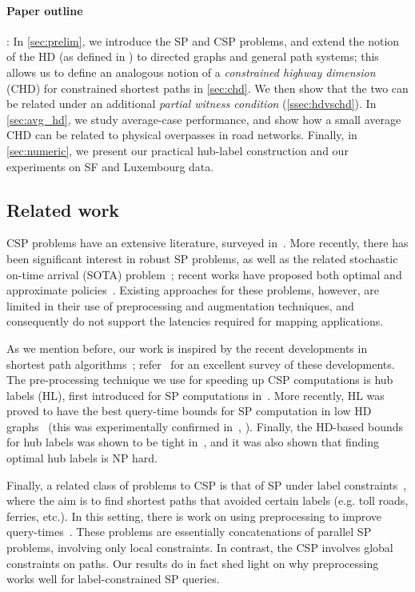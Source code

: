\paragraph{Paper outline}:
In \cref{sec:prelim}, we introduce the SP and CSP problems, and extend the notion of the HD (as defined in \cite{highway2013}) to directed graphs and general path systems; this allows us to define an analogous notion of a \emph{constrained highway dimension} (CHD) for constrained shortest paths in \cref{sec:chd}. 
We then show that the two can be related under an additional \emph{partial witness condition} (\cref{ssec:hdvschd}). 
In \cref{sec:avg_hd}, we study average-case performance, and show how a small average CHD can be related to physical overpasses in road networks. 
Finally, in \cref{sec:numeric}, we present our practical hub-label construction and our experiments on SF and Luxembourg data.


\subsection{Related work}

CSP problems have an extensive literature, surveyed in~\cite{csp_survey}. 
More recently, there has been significant interest in robust SP problems, as well as the related stochastic on-time arrival (SOTA) problem~\cite{fan2005arriving}; recent works have proposed both optimal and approximate policies~\cite{sabran2014precomputation,nikolova_discretization}. 
Existing approaches for these problems, however, are limited in their use of preprocessing and augmentation techniques, and consequently do not support the latencies required for mapping applications.

As we mention before, our work is inspired by the recent developments in shortest path algorithms~\cite{highway2013,hubimplem,highway2010,dimacs09,geisberger_ch_definition,skeleton}; refer~\cite{goldberg_survey} for an excellent survey of these developments. 
The pre-processing technique we use for speeding up CSP computations is hub labels (HL), first introduced for SP computations in~\cite{cohen_definition_hl}. 
More recently, HL was proved to have the best query-time bounds for SP computation in low HD graphs~\cite{highway2013,highway2010} (this was experimentally confirmed in~\cite{hubimplem}, \cite[Figure 7]{goldberg_survey}).  
Finally, the HD-based bounds for hub labels was shown to be tight in~\cite{babenko_hl_complexity,white_complexity_hd}, and it was also shown that finding optimal hub labels is NP hard.

Finally, a related class of problems to CSP is that of SP under label constraints~\cite{language_csp}, where the aim is to find shortest paths that avoided certain labels (e.g. toll roads, ferries, etc.). 
In this setting, there is work on using preprocessing to improve query-times~\cite{rice_csp}.
These problems are essentially concatenations of parallel SP problems, involving only local constraints. 
In contrast, the CSP involves global constraints on paths.
Our results do in fact shed light on why preprocessing works well for label-constrained SP queries.